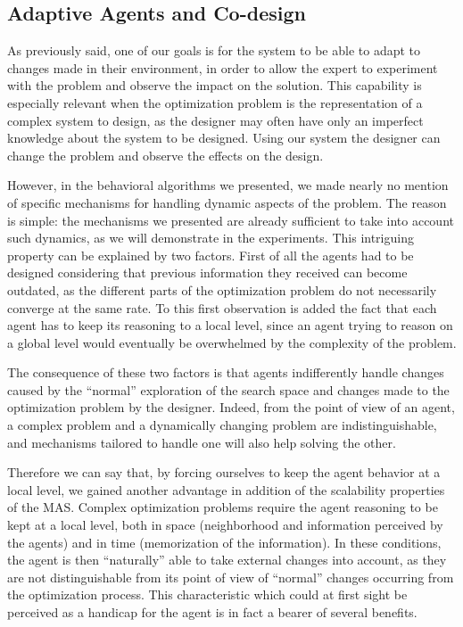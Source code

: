 \subsection{Adaptive Agents and Co-design}

As previously said, one of our goals is for the system to be able to adapt to changes made in their environment, in order to allow the expert to experiment with the problem and observe the impact on the solution. This capability is especially relevant when the optimization problem is the representation of a complex system to design, as the designer may often have only an imperfect knowledge about the system to be designed. Using our system the designer can change the problem and observe the effects on the design.

However, in the behavioral algorithms we presented, we made nearly no mention of specific mechanisms for handling dynamic aspects of the problem. The reason is simple: the mechanisms we presented are already sufficient to take into account such dynamics, as we will demonstrate in the experiments. This intriguing property can be explained by two factors. First of all the agents had to be designed considering that previous information they received can become outdated, as the different parts of the optimization problem do not necessarily converge at the same rate. To this first observation is added the fact that each agent has to keep its reasoning to a local level, since an agent trying to reason on a global level would eventually be overwhelmed by the complexity of the problem. 

The consequence of these two factors is that agents indifferently handle changes caused by the \enquote{normal} exploration of the search space and changes made to the optimization problem by the designer. Indeed, from the point of view of an agent, a complex problem and a dynamically changing problem are indistinguishable, and mechanisms tailored to handle one will also help solving the other.

Therefore we can say that, by forcing ourselves to keep the agent behavior at a local level, we gained another advantage in addition of the scalability properties of the MAS. Complex optimization problems require the agent reasoning to be kept at a local level, both in space (neighborhood and information perceived by the agents) and in time (memorization of the information). In these conditions, the agent is then \enquote{naturally} able to take external changes into account, as they are not distinguishable from its point of view of \enquote{normal} changes occurring from the optimization process. This characteristic which could at first sight be perceived as a handicap for the agent is in fact a bearer of several benefits.

